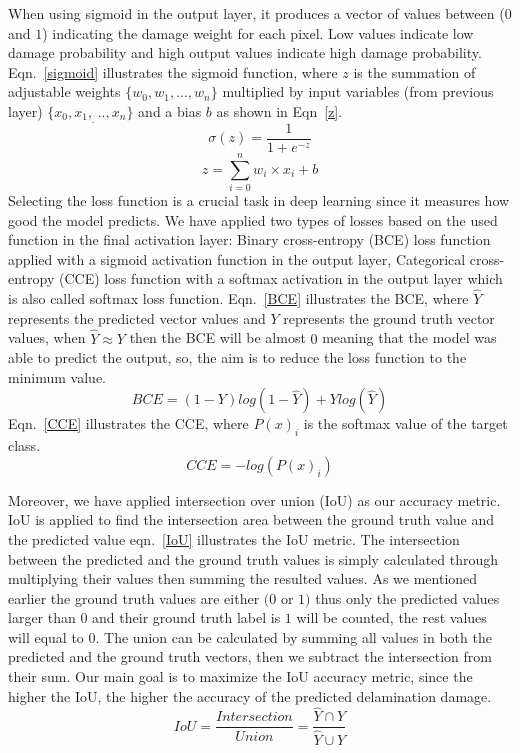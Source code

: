 	When using sigmoid in the output layer, it produces a vector of values between (\(0\) and \(1\)) indicating the damage weight for each pixel. 
	Low values indicate low damage probability and high output values indicate high damage probability. Eqn.~\ref{sigmoid} illustrates the sigmoid function, 
	where \(z\) is the summation of adjustable weights \(\{w_0,w_1,...,w_n \}\) multiplied by input variables (from previous layer) \(\{x_0,x_1,_...,x_n\}\) and a bias \(b\) as shown in Eqn~\ref{z}.	
	\begin{equation}
		\sigma(z) = \frac{1}{1+e^{-z}}
		\label{sigmoid}
	\end{equation}
	\begin{equation}
		z= \sum_{i=0}^{n}  w_i\times x_i +b
		\label{z}
	\end{equation}
	Selecting the loss function is a crucial task in deep learning since it measures how good the model predicts.
	We have applied two types of losses based on the used function in the final activation layer: Binary cross-entropy (BCE) loss function applied with a sigmoid activation function in the output layer, Categorical cross-entropy (CCE) loss function with a softmax activation in the output layer which is also called softmax loss function.
	Eqn.~\ref{BCE} illustrates the BCE, where \(\hat{Y}\) represents the predicted vector values and \(Y\) represents the ground truth vector values, when \(\hat{Y} \approx Y\) then the BCE will be almost \(0\) meaning that the model was able to predict the output, so, the aim is to reduce the loss function to the minimum value.
	\begin{equation}
		BCE = (1-Y)log(1-\hat{Y})+Ylog(\hat{Y})
		\label{BCE}
	\end{equation}
	Eqn.~\ref{CCE} illustrates the CCE, where \( P(x)_{i}\) is the softmax value of the target class. 
	\begin{equation}
	CCE = -log\left( P(x)_{i} \right)
	\label{CCE}
	\end{equation}

	Moreover, we have applied intersection over union (IoU) as our accuracy metric. 
	IoU is applied to find the intersection area between the ground truth value and the predicted value eqn.~\ref{IoU} illustrates the IoU metric.
	The intersection between the predicted and the ground truth values is simply calculated through multiplying their values then summing the resulted values.
	As we mentioned earlier the ground truth values are either \((0\) or \(1)\) thus only the predicted values larger than \(0\) and their ground truth label is \(1\) will be counted, the rest values will equal to \(0\). 
	The union can be calculated by summing all values in both the predicted and the ground truth  vectors, then we subtract the intersection from their sum.
	Our main goal is to maximize the IoU accuracy metric, since the higher the IoU, the higher the accuracy of the predicted delamination damage.
	\begin{equation}
	IoU = \frac{Intersection}{Union} = \frac{\hat{Y} \cap Y}{\hat{Y} \cup Y} 
	\label{IoU}
	\end{equation}

